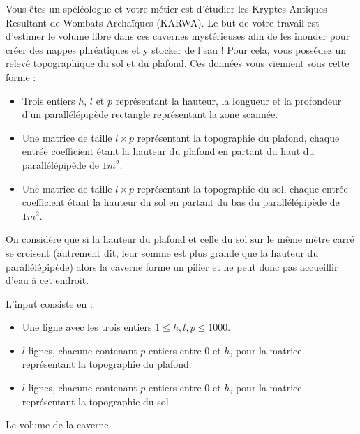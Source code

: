 \problemname{\problemyamlname{}}


Vous êtes un spéléologue et votre métier est d'étudier les Kryptes Antiques Resultant de Wombats Archaïques (KARWA). Le but de votre travail est d'estimer le volume libre dans ces cavernes mystérieuses afin de les inonder pour créer des nappes phréatiques et y stocker de l'eau ! Pour cela, vous possédez un relevé topographique du sol et du plafond. Ces données vous viennent sous cette forme :
\begin{itemize}
\item Trois entiers $h$, $l$ et $p$ représentant la hauteur, la longueur et la profondeur d'un parallélépipède rectangle représentant la zone scannée.
\item Une matrice de taille $l\times p$ représentant la topographie du plafond, chaque entrée coefficient étant la hauteur du plafond en partant du haut du parallélépipède de $1m^2$.
\item Une matrice de taille $l\times p$ représentant la topographie du sol, chaque entrée coefficient étant la hauteur du sol en partant du bas du parallélépipède de $1m^2$.
\end{itemize}

On considère que si la hauteur du plafond et celle du sol sur le même mètre carré se croisent (autrement dit, leur somme est plus grande que la hauteur du parallélépipède) alors la caverne forme un pilier et ne peut donc pas accueillir d'eau à cet endroit.

\begin{Input}
    L'input consiste en :
    \begin{itemize}
        \item Une ligne avec les trois entiers $1 \leq h, l, p \leq 1000$.
        \item $l$ lignes, chacune contenant $p$ entiers entre $0$ et $h$, pour la matrice représentant la topographie du plafond.
        \item $l$ lignes, chacune contenant $p$ entiers entre $0$ et $h$, pour la matrice représentant la topographie du sol.
    \end{itemize}
\end{Input}

\begin{Output}
    Le volume de la caverne.
\end{Output}
